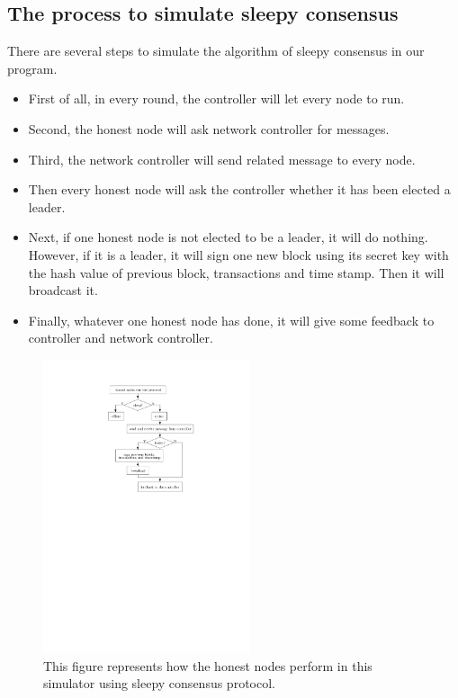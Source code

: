 \documentclass{llncs}
\begin{document}
\subsection{The process to simulate sleepy consensus}
\quad There are several steps to simulate the algorithm of sleepy consensus in our program.
\begin{itemize}
	\item First of all, in every round, the controller will 	let every node to run.\\
	\item Second, the honest node will ask network controller for messages.\\
	\item Third, the network controller will send related message to every node.\\
	\item Then every honest node will ask the controller whether it  has been elected a leader.\\
	\item Next, if one honest node is not elected to be a leader, it will do nothing. However, if it is a leader, it will sign one new block using its secret key with the hash value of previous block, transactions and time stamp. Then it will broadcast it.\\
	\item Finally, whatever one honest node has done, it will give some feedback to controller and network controller.\\
\end{itemize}
\vspace{-4mm}
\begin{figure}
\centering
\includegraphics[width=2.4in]{Figures/honest.pdf}
\vspace{-3mm}
\caption{This figure represents how the honest nodes perform in this simulator using sleepy consensus protocol.}
\end{figure}
%
\end{document}
